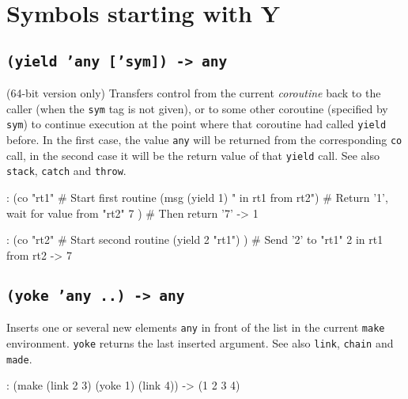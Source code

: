 %
%
%



\chapter{Symbols starting with Y}
\label{cha:func-ref-Y-functions-starting-with-Y}
 
\section*{\texttt{(yield 'any ['sym]) -> any}}
\label{sec:func-ref-Y-(yield 'any ['sym]) -> any}


(64-bit version only) Transfers control from the current
\emph{coroutine} back to the caller (when the \texttt{sym}
tag is not given), or to some other coroutine (specified by \texttt{sym}) to
continue execution at the point where that coroutine had called \texttt{yield}
before. In the first case, the value \texttt{any} will be returned from the
corresponding \texttt{co} call, in the second case it will be the return value
of that \texttt{yield} call. See also \texttt{stack}, \texttt{catch} and \texttt{throw}.


\begin{wideverbatim}
: (co "rt1"                            # Start first routine
   (msg (yield 1) " in rt1 from rt2")  # Return '1', wait for value from "rt2"
   7 )                                 # Then return '7'
-> 1

: (co "rt2"                            # Start second routine
   (yield 2 "rt1") )                   # Send '2' to "rt1"
2 in rt1 from rt2
-> 7
\end{wideverbatim}

 
\section*{\texttt{(yoke 'any ..) -> any}}
\label{sec:func-ref-Y-(yoke 'any ..) -> any}


Inserts one or several new elements \texttt{any} in front of the list in the
current \texttt{make} environment. \texttt{yoke} returns the last inserted argument.
See also \texttt{link}, \texttt{chain} and \texttt{made}.


\begin{wideverbatim}
: (make (link 2 3) (yoke 1) (link 4))
-> (1 2 3 4)
\end{wideverbatim}


